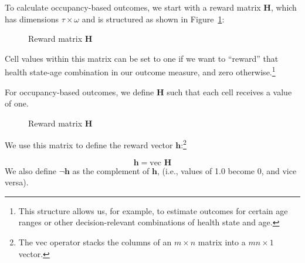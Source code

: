 \documentclass[
]{agujournal2019}
\begin{document}
To calculate occupancy-based outcomes, we start with a reward matrix
\(\mathbf{H}\), which has dimensions \(\tau \times \omega\) and is
structured as shown in Figure~\ref{fig-H-le}:

\begin{figure}


\caption{\label{fig-H-le}Reward matrix \(\mathbf{H}\)}

\end{figure}%

Cell values within this matrix can be set to one if we want to
``reward'' that health state-age combination in our outcome measure, and
zero otherwise.\footnote{This structure allows us, for example, to
  estimate outcomes for certain age ranges or other decision-relevant
  combinations of health state and age.}

For occupancy-based outcomes, we define \(\mathbf{H}\) such that each
cell receives a value of one.

\begin{figure}


\caption{\label{fig-H}Reward matrix \(\mathbf{H}\)}

\end{figure}%

We use this matrix to define the reward vector
\(\mathbf{h}\):\footnote{The \(\text{vec}\) operator stacks the columns
  of an \(m \times n\) matrix into a \(mn \times 1\) vector.}

\[
\mathbf{h} = \text{vec } \mathbf{H}
\] We also define \(\neg \mathbf{h}\) as the complement of
\(\mathbf{h}\), (i.e., values of 1.0 become 0, and vice versa).
\end{document}
